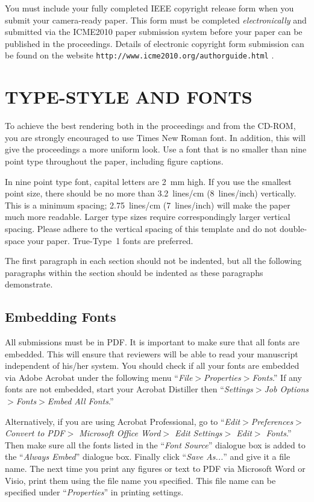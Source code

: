 \documentclass{article}
\begin{document}
You must include your fully completed IEEE copyright release form
when you submit your camera-ready paper. This form must be completed
\emph{electronically} and submitted via the ICME2010 paper
submission system before your paper can be published in the
proceedings. Details of electronic copyright form submission can be
found on the website \verb"http://www.icme2010.org/authorguide.html"
.


\section{TYPE-STYLE AND FONTS}
\label{sec:typestyle}

To achieve the best rendering both in the proceedings and from the
CD-ROM, you are strongly encouraged to use Times New Roman font.  In
addition, this will give the proceedings a more uniform look.  Use a
font that is no smaller than nine point type throughout the paper,
including figure captions.

In nine point type font, capital letters are 2~mm high.  If you use
the smallest point size, there should be no more than 3.2~lines/cm
(8~lines/inch) vertically.  This is a minimum spacing; 2.75~lines/cm
(7~lines/inch) will make the paper much more readable.  Larger type
sizes require correspondingly larger vertical spacing.  Please
adhere to the vertical spacing of this template and do not
double-space your paper. True-Type~1 fonts are preferred.

The first paragraph in each section should not be indented, but all the
following paragraphs within the section should be indented as these paragraphs
demonstrate.

\subsection{Embedding Fonts}
\label{sec:embedFonts}

All submissions must be in PDF. It is important to make sure that
all fonts are embedded. This will ensure that reviewers will be able
to read your manuscript independent of his/her system. You should
check if all your fonts are embedded via Adobe Acrobat under the
following menu ``\emph{File$>$Properties$>$Fonts}.'' If any fonts
are not embedded, start your Acrobat Distiller then
``\emph{Settings$>$Job Options$>$Fonts$>$Embed All Fonts}.''

Alternatively, if you are using Acrobat Professional, go to
``\emph{Edit$>$Preferences$>$Convert to PDF$>$ Microsoft Office
Word$>$ Edit Settings$>$ Edit$>$ Fonts}.'' Then make sure all the
fonts listed in the ``\emph{Font Source}'' dialogue box is added to
the ``\emph{Always Embed}'' dialogue box. Finally click ``\emph{Save
As...}'' and give it a file name. The next time you print any
figures or text to PDF via Microsoft Word or Visio, print them using
the file name you specified. This file name can be specified under
``\emph{Properties}'' in printing settings.
\end{document}
